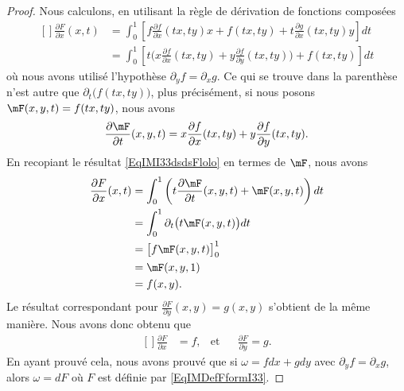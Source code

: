 \begin{proof}
	Nous calculons, en utilisant la règle de dérivation de fonctions composées
	\begin{equation}		\label{EqIMI33dsdsFlolo}
		\begin{aligned}[]
			\frac{ \partial F }{ \partial x }(x,t) & =\int_0^1\left[   f\frac{ \partial f }{ \partial x }(tx,ty)x+f(tx,ty)+t\frac{ \partial g }{ \partial x }(tx,ty)y  \right]dt         \\
			                                       & =\int_0^1\left[ t\Big( x\frac{ \partial f }{ \partial x }(tx,ty)+y\frac{ \partial f }{ \partial y }(tx,ty) \Big)+f(tx,ty) \right]dt
		\end{aligned}
	\end{equation}
	où nous avons utilisé l'hypothèse \( \partial_yf=\partial_xg\). Ce qui se trouve dans la parenthèse n'est autre que \( \partial_t\big( f(tx,ty) \big)\), plus précisément, si nous posons \( \mF(x,y,t)=f(tx,ty)\), nous avons
	\begin{equation}
		\frac{ \partial \mF }{ \partial t }(x,y,t)= x\frac{ \partial f }{ \partial x }(tx,ty)+y\frac{ \partial f }{ \partial y }(tx,ty).
	\end{equation}
	En recopiant le résultat \eqref{EqIMI33dsdsFlolo} en termes de \( \mF\), nous avons
	\begin{equation}
		\begin{aligned}[]
			\frac{ \partial F }{ \partial x }(x,t) & =\int_0^1\left( t\frac{ \partial \mF }{ \partial t }(x,y,t)+\mF(x,y,t) \right)dt \\
			                                       & =\int_0^1\partial_t\big( t\mF(x,y,t) \big)dt                                     \\
			                                       & =\big[ f\mF(x,y,t) \big]_0^1                                                     \\
			                                       & =\mF(x,y,1)                                                                      \\
			                                       & =f(x,y).
		\end{aligned}
	\end{equation}
	Le résultat correspondant pour \( \frac{ \partial F }{ \partial y }(x,y)=g(x,y)\) s'obtient de la même manière. Nous avons donc obtenu que
	\begin{equation}		\label{EqIMFormI33Fffdd}
		\begin{aligned}[]
			\frac{ \partial F }{ \partial x } & =f, & \text{et} &  & \frac{ \partial F }{ \partial y }=g.
		\end{aligned}
	\end{equation}
	En ayant prouvé cela, nous avons prouvé que si \( \omega=fdx+gdy\) avec \( \partial_yf=\partial_xg\), alors \( \omega=dF\) où \( F\) est définie par \eqref{EqIMDefFformI33}.
\end{proof}

